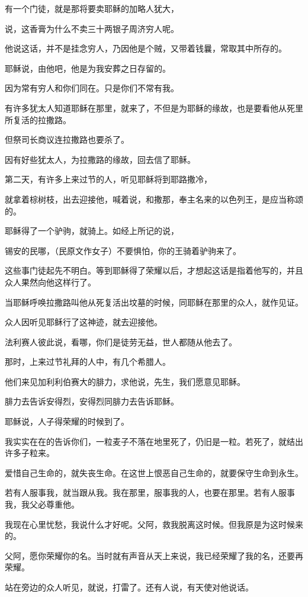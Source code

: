 \documentclass[12pt,oneside]{book}
\begin{document}
有一个门徒，就是那将要卖耶稣的加略人犹大，

说，这香膏为什么不卖三十两银子周济穷人呢。

他说这话，并不是挂念穷人，乃因他是个贼，又带着钱曩，常取其中所存的。

耶稣说，由他吧，他是为我安葬之日存留的。

因为常有穷人和你们同在。只是你们不常有我。

有许多犹太人知道耶稣在那里，就来了，不但是为耶稣的缘故，也是要看他从死里所复活的拉撒路。

但祭司长商议连拉撒路也要杀了。

因有好些犹太人，为拉撒路的缘故，回去信了耶稣。

第二天，有许多上来过节的人，听见耶稣将到耶路撒冷，

就拿着棕树枝，出去迎接他，喊着说，和撒那，奉主名来的以色列王，是应当称颂的。

耶稣得了一个驴驹，就骑上。如经上所记的说，

锡安的民哪，（民原文作女子）不要惧怕，你的王骑着驴驹来了。

这些事门徒起先不明白。等到耶稣得了荣耀以后，才想起这话是指着他写的，并且众人果然向他这样行了。

当耶稣呼唤拉撒路叫他从死复活出坟墓的时候，同耶稣在那里的众人，就作见证。

众人因听见耶稣行了这神迹，就去迎接他。

法利赛人彼此说，看哪，你们是徒劳无益，世人都随从他去了。

那时，上来过节礼拜的人中，有几个希腊人。

他们来见加利利伯赛大的腓力，求他说，先生，我们愿意见耶稣。

腓力去告诉安得烈，安得烈同腓力去告诉耶稣。

耶稣说，人子得荣耀的时候到了。

我实实在在的告诉你们，一粒麦子不落在地里死了，仍旧是一粒。若死了，就结出许多子粒来。

爱惜自己生命的，就失丧生命。在这世上恨恶自己生命的，就要保守生命到永生。

若有人服事我，就当跟从我。我在那里，服事我的人，也要在那里。若有人服事我，我父必尊重他。

我现在心里忧愁，我说什么才好呢。父阿，救我脱离这时候。但我原是为这时候来的。

父阿，愿你荣耀你的名。当时就有声音从天上来说，我已经荣耀了我的名，还要再荣耀。

站在旁边的众人听见，就说，打雷了。还有人说，有天使对他说话。
\end{document}

